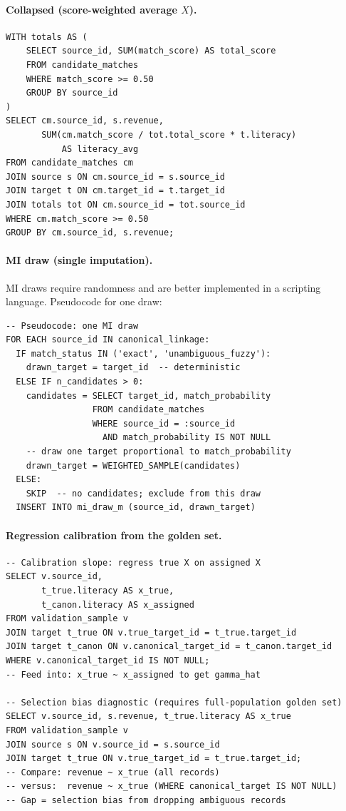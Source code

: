 \paragraph{Collapsed (score-weighted average $X$).}

\begin{lstlisting}[style=sql]
WITH totals AS (
    SELECT source_id, SUM(match_score) AS total_score
    FROM candidate_matches
    WHERE match_score >= 0.50
    GROUP BY source_id
)
SELECT cm.source_id, s.revenue,
       SUM(cm.match_score / tot.total_score * t.literacy)
           AS literacy_avg
FROM candidate_matches cm
JOIN source s ON cm.source_id = s.source_id
JOIN target t ON cm.target_id = t.target_id
JOIN totals tot ON cm.source_id = tot.source_id
WHERE cm.match_score >= 0.50
GROUP BY cm.source_id, s.revenue;
\end{lstlisting}

\paragraph{MI draw (single imputation).}
MI draws require randomness and are better implemented in a scripting language. Pseudocode for one draw:

\begin{lstlisting}[style=sql]
-- Pseudocode: one MI draw
FOR EACH source_id IN canonical_linkage:
  IF match_status IN ('exact', 'unambiguous_fuzzy'):
    drawn_target = target_id  -- deterministic
  ELSE IF n_candidates > 0:
    candidates = SELECT target_id, match_probability
                 FROM candidate_matches
                 WHERE source_id = :source_id
                   AND match_probability IS NOT NULL
    -- draw one target proportional to match_probability
    drawn_target = WEIGHTED_SAMPLE(candidates)
  ELSE:
    SKIP  -- no candidates; exclude from this draw
  INSERT INTO mi_draw_m (source_id, drawn_target)
\end{lstlisting}

\paragraph{Regression calibration from the golden set.}

\begin{lstlisting}[style=sql]
-- Calibration slope: regress true X on assigned X
SELECT v.source_id,
       t_true.literacy AS x_true,
       t_canon.literacy AS x_assigned
FROM validation_sample v
JOIN target t_true ON v.true_target_id = t_true.target_id
JOIN target t_canon ON v.canonical_target_id = t_canon.target_id
WHERE v.canonical_target_id IS NOT NULL;
-- Feed into: x_true ~ x_assigned to get gamma_hat

-- Selection bias diagnostic (requires full-population golden set)
SELECT v.source_id, s.revenue, t_true.literacy AS x_true
FROM validation_sample v
JOIN source s ON v.source_id = s.source_id
JOIN target t_true ON v.true_target_id = t_true.target_id;
-- Compare: revenue ~ x_true (all records)
-- versus:  revenue ~ x_true (WHERE canonical_target IS NOT NULL)
-- Gap = selection bias from dropping ambiguous records
\end{lstlisting}

